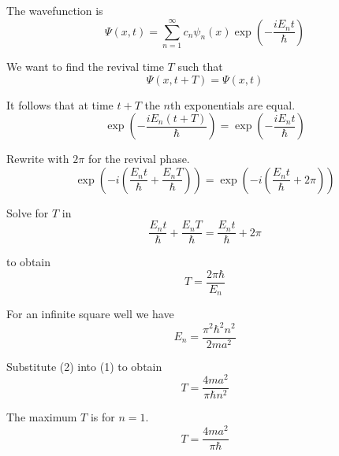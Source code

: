 


The wavefunction is
\begin{equation*}
\Psi(x,t)=\sum_{n=1}^\infty c_n\psi_n(x)\exp\left(-\frac{iE_nt}{\hbar}\right)
\end{equation*}

We want to find the revival time $T$ such that
\begin{equation*}
\Psi(x,t+T)=\Psi(x,t)
\end{equation*}

It follows that at time $t+T$ the $n$th exponentials are equal.
\begin{equation*}
\exp\left(-\frac{iE_n(t+T)}{\hbar}\right)
=\exp\left(-\frac{iE_nt}{\hbar}\right)
\end{equation*}

Rewrite with $2\pi$ for the revival phase.
\begin{equation*}
\exp\left(-i\left(\frac{E_nt}{\hbar}+\frac{E_nT}{\hbar}\right)\right)
=\exp\left(-i\left(\frac{E_nt}{\hbar}+2\pi\right)\right)
\end{equation*}

Solve for $T$ in
\begin{equation*}
\frac{E_nt}{\hbar}+\frac{E_nT}{\hbar}=\frac{E_nt}{\hbar}+2\pi
\end{equation*}

to obtain
\begin{equation*}
T=\frac{2\pi\hbar}{E_n}
\tag{1}
\end{equation*}

For an infinite square well we have
\begin{equation*}
E_n=\frac{\pi^2\hbar^2 n^2}{2ma^2}
\tag{2}
\end{equation*}

Substitute (2) into (1) to obtain
\begin{equation*}
T=\frac{4ma^2}{\pi\hbar n^2}
\end{equation*}

The maximum $T$ is for $n=1$.
\begin{equation*}
T=\frac{4ma^2}{\pi\hbar}
\end{equation*}


